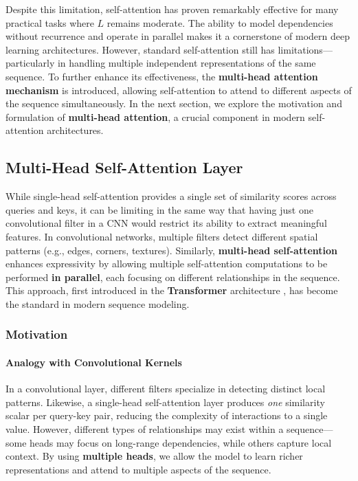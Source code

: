 \noindent Despite this limitation, self-attention has proven remarkably effective for many practical tasks where \( L \) remains moderate. The ability to model dependencies without recurrence and operate in parallel makes it a cornerstone of modern deep learning architectures. However, standard self-attention still has limitations—particularly in handling multiple independent representations of the same sequence. To further enhance its effectiveness, the \textbf{multi-head attention mechanism} is introduced, allowing self-attention to attend to different aspects of the sequence simultaneously. In the next section, we explore the motivation and formulation of \textbf{multi-head attention}, a crucial component in modern self-attention architectures.

\subsection{Multi-Head Self-Attention Layer}
\label{subsec:chapter17_multihead_self_attention}

\noindent 
While single-head self-attention provides a single set of similarity scores across queries and keys, it can be limiting in the same way that having just one convolutional filter in a CNN would restrict its ability to extract meaningful features. In convolutional networks, multiple filters detect different spatial patterns (e.g., edges, corners, textures). Similarly, \textbf{multi-head self-attention} enhances expressivity by allowing multiple self-attention computations to be performed \textbf{in parallel}, each focusing on different relationships in the sequence. This approach, first introduced in the \textbf{Transformer} architecture \cite{vaswani2017_attention}, has become the standard in modern sequence modeling.

\subsubsection{Motivation}

\paragraph{Analogy with Convolutional Kernels} 
In a convolutional layer, different filters specialize in detecting distinct local patterns. Likewise, a single-head self-attention layer produces \emph{one} similarity scalar per query-key pair, reducing the complexity of interactions to a single value. However, different types of relationships may exist within a sequence—some heads may focus on long-range dependencies, while others capture local context. By using \textbf{multiple heads}, we allow the model to learn richer representations and attend to multiple aspects of the sequence.


